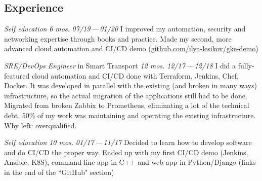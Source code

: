 \documentclass[11pt, a4paper]{article}
\newcommand{\Delimitline}{
  \vspace{-2ex}
  \noindent\makebox[\linewidth]{\rule{\DelimitlineLength}{0.12ex}} }
\newcommand{\forceindent}{\leavevmode{\parindent=1em\indent}}
\begin{document}

\subsection*{\vphantom{Professional Work }Experience}
\Delimitline

\begin{etaremune}[
  topsep=1ex,itemsep=1.5ex,partopsep=0ex,
  parsep=0ex,rightmargin=1em,leftmargin=2em
]
  \item
    \emph{Self education}\hfill
    \textit{6 mos.}\hspace{1.0em}
    \textit{07/19\,—\,01/20}\vspace{1.5ex}\newline
    \forceindent I improved my automation, security and networking expertise through books and practice. Made my second, more advanced cloud automation and CI/CD demo (\href{https://github.com/ilya-lesikov/gke-demo}{github.com/ilya-lesikov/gke-demo})

  \item
    \emph{SRE/DevOps Engineer}\hfill
    in Smart Transport\hspace{1.0em}
    \textit{12 mos.}\hspace{1.0em}
    \textit{12/17\,—\,12/18}\vspace{1.5ex}\newline
    \forceindent I did a fully-featured cloud automation and CI/CD done with Terraform, Jenkins, Chef, Docker. It was developed in parallel with the existing (and broken in many ways) infrastructure, so the actual migration of the applications still had to be done. Migrated from broken Zabbix to Prometheus, eliminating a lot of the technical debt. 50\% of my work was maintaining and operating the existing infrastructure.\\[0.7ex]
    \forceindent Why left: overqualified.

\newpage

  \item
    \emph{Self education}\hfill
    \textit{10 mos.}\hspace{1.0em}
    \textit{01/17\,—\,11/17}\vspace{1.5ex}\newline
    \forceindent Decided to learn how to develop software and do CI/CD the proper way. Ended up with my first CI/CD demo (Jenkins, Ansible, K8S), command-line app in C++ and web app in Python/Django (links in the end of the ``GitHub" section)


\end{etaremune}
\end{document}
